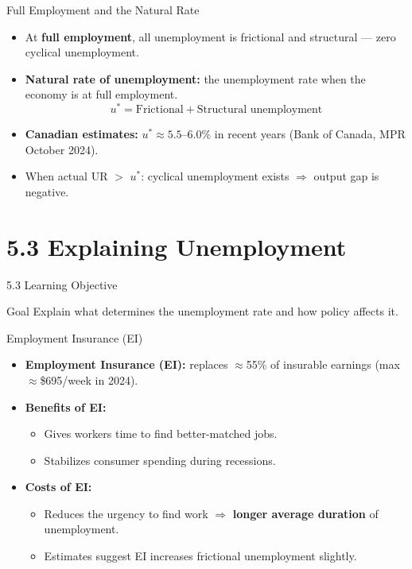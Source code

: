 \documentclass[aspectratio=169]{beamer}
\begin{document}
\begin{frame}{Full Employment and the Natural Rate}
\transfade
\begin{itemize}
  \item At \textbf{full employment}, all unemployment is frictional and structural --- zero cyclical unemployment.
  \item \textbf{Natural rate of unemployment:} the unemployment rate when the economy is at full employment.
  \[
    u^* = \text{Frictional} + \text{Structural unemployment}
  \]
  \item \textbf{Canadian estimates:} $u^* \approx 5.5$--$6.0\%$ in recent years (Bank of Canada, MPR October 2024).
  \item When actual UR $>$ $u^*$: cyclical unemployment exists $\Rightarrow$ output gap is negative.
\end{itemize}
\end{frame}

\section{5.3 Explaining Unemployment}

\begin{frame}{5.3 Learning Objective}
\transfade
\begin{block}{Goal}
Explain what determines the unemployment rate and how policy affects it.
\end{block}
\end{frame}

\begin{frame}{Employment Insurance (EI)}
\transfade
\begin{itemize}
  \item \textbf{Employment Insurance (EI):} replaces $\approx$55\% of insurable earnings (max $\approx$\$695/week in 2024).
  \item \textbf{Benefits of EI:}
  \begin{itemize}
    \item Gives workers time to find better-matched jobs.
    \item Stabilizes consumer spending during recessions.
  \end{itemize}
  \item \textbf{Costs of EI:}
  \begin{itemize}
    \item Reduces the urgency to find work $\Rightarrow$ \textbf{longer average duration} of unemployment.
    \item Estimates suggest EI increases frictional unemployment slightly.
  \end{itemize}
\end{itemize}
\end{frame}
\end{document}
